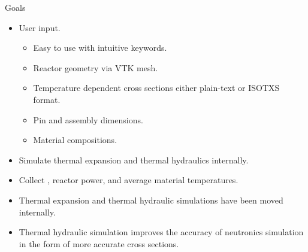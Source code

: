 \begin{frame}{Goals}
  \begin{itemize}
    \item User input.
      \begin{itemize}
        \item Easy to use with intuitive keywords.
        \item Reactor geometry via VTK mesh.
        \item Temperature dependent cross sections either plain-text or ISOTXS
          format.
        \item Pin and assembly dimensions.
        \item Material compositions.
      \end{itemize}
    \item Simulate thermal expansion and thermal hydraulics internally.
    \item Collect \keff, reactor power, and average material temperatures.
  \end{itemize}
  \vspace{0.2in}
  \begin{itemize}
    \item Thermal expansion and thermal hydraulic simulations have been moved
      internally.
    \item Thermal hydraulic simulation improves the accuracy of neutronics
      simulation in the form of more accurate cross sections.
  \end{itemize}
\end{frame}
